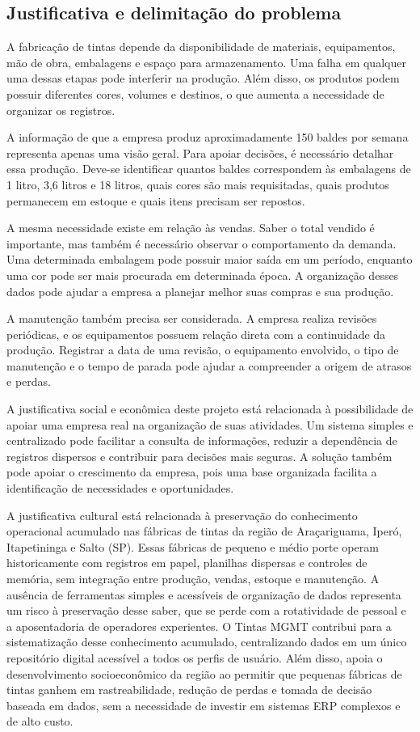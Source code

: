 \documentclass[12pt,a4paper]{article}
\begin{document}
\subsection{Justificativa e delimitação do problema}
A fabricação de tintas depende da disponibilidade de materiais, equipamentos, mão de obra, embalagens e espaço para armazenamento. Uma falha em qualquer uma dessas etapas pode interferir na produção. Além disso, os produtos podem possuir diferentes cores, volumes e destinos, o que aumenta a necessidade de organizar os registros.

A informação de que a empresa produz aproximadamente 150 baldes por semana representa apenas uma visão geral. Para apoiar decisões, é necessário detalhar essa produção. Deve-se identificar quantos baldes correspondem às embalagens de 1 litro, 3,6 litros e 18 litros, quais cores são mais requisitadas, quais produtos permanecem em estoque e quais itens precisam ser repostos.

A mesma necessidade existe em relação às vendas. Saber o total vendido é importante, mas também é necessário observar o comportamento da demanda. Uma determinada embalagem pode possuir maior saída em um período, enquanto uma cor pode ser mais procurada em determinada época. A organização desses dados pode ajudar a empresa a planejar melhor suas compras e sua produção.

A manutenção também precisa ser considerada. A empresa realiza revisões periódicas, e os equipamentos possuem relação direta com a continuidade da produção. Registrar a data de uma revisão, o equipamento envolvido, o tipo de manutenção e o tempo de parada pode ajudar a compreender a origem de atrasos e perdas.

A justificativa social e econômica deste projeto está relacionada à possibilidade de apoiar uma empresa real na organização de suas atividades. Um sistema simples e centralizado pode facilitar a consulta de informações, reduzir a dependência de registros dispersos e contribuir para decisões mais seguras. A solução também pode apoiar o crescimento da empresa, pois uma base organizada facilita a identificação de necessidades e oportunidades.

A justificativa cultural está relacionada à preservação do conhecimento operacional acumulado nas fábricas de tintas da região de Araçariguama, Iperó, Itapetininga e Salto (SP). Essas fábricas de pequeno e médio porte operam historicamente com registros em papel, planilhas dispersas e controles de memória, sem integração entre produção, vendas, estoque e manutenção. A ausência de ferramentas simples e acessíveis de organização de dados representa um risco à preservação desse saber, que se perde com a rotatividade de pessoal e a aposentadoria de operadores experientes. O Tintas MGMT contribui para a sistematização desse conhecimento acumulado, centralizando dados em um único repositório digital acessível a todos os perfis de usuário. Além disso, apoia o desenvolvimento socioeconômico da região ao permitir que pequenas fábricas de tintas ganhem em rastreabilidade, redução de perdas e tomada de decisão baseada em dados, sem a necessidade de investir em sistemas ERP complexos e de alto custo.
\end{document}
